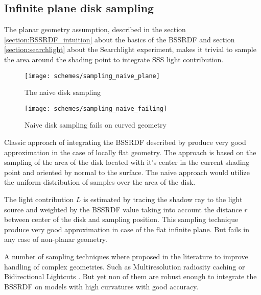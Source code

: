 \subsection{Infinite plane disk sampling}
\label{subsection:sampling_simple_disk}
The planar geometry assumption, described in the section \ref{section:BSSRDF_intuition} about the
basics of the BSSRDF and section \ref{section:searchlight} about the  Searchlight experiment, makes
it trivial to sample the area around the shading point to integrate SSS light contribution.
\begin{wrapfigure}{r}{0.3\textwidth}
    \begin{center}
        \texttt{[image: schemes/sampling\_naive\_plane]}
        \caption{The naive disk sampling}
    \end{center}
    \vspace{5pt}
    \label{fig:sampling_naive}
\end{wrapfigure}
\begin{wrapfigure}{r}{0.3\textwidth}
    \begin{center}
        \texttt{[image: schemes/sampling\_naive\_failing]}
        \caption{Naive disk sampling fails on curved geometry}
    \end{center}
    \vspace{-20pt}
    \label{fig:sampling_naive_fails}
\end{wrapfigure}
Classic approach of integrating the BSSRDF described by \cite{Jensen:2001:PMS:383259.383319} 
produce very good approximation in the case of locally flat geometry. The approach is based on the
sampling of the area of the disk located with it's center in the current shading point and oriented
by normal to the surface. The naive approach would utilize the uniform distribution of samples over
the area of the disk.

The light contribution $L$ is estimated by tracing the shadow ray to the light source and
weighted by the BSSRDF value taking into account the distance $r$ between center of the disk and
sampling position. This sampling technique produce very good approximation in case of the flat
infinite plane. But fails in any case of non-planar geometry.

A number of sampling techniques where proposed in the literature to improve handling of complex
geometries. Such as Multiresolution radiosity caching \cite{Christensen:2012:MRC:2343045.2343108} or
Bidirectional Lightcuts \cite{Walter:2012:BL:2185520.2185555}. But yet non of them are robust enough
to integrate the BSSRDF on models with high curvatures with good accuracy.

